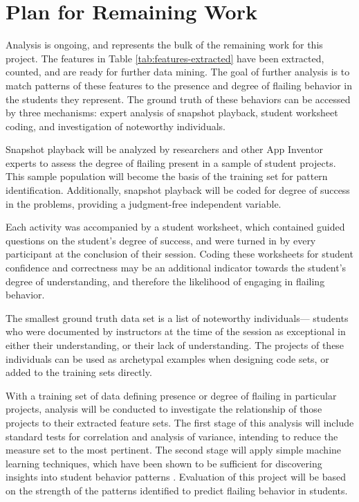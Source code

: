 \section{Plan for Remaining Work}
Analysis is ongoing, and represents the bulk of the remaining work for this project. The features in Table \ref{tab:features-extracted} have been extracted, counted, and are ready for further data mining. The goal of further analysis is to match patterns of these features to the presence and degree of flailing behavior in the students they represent. The ground truth of these behaviors can be accessed by three mechanisms: expert analysis of snapshot playback, student worksheet coding, and investigation of noteworthy individuals.  

Snapshot playback will be analyzed by researchers and other App Inventor experts to assess the degree of flailing present in a sample of student projects. This sample population will become the basis of the training set for pattern identification. Additionally, snapshot playback will be coded for degree of success in the problems, providing a judgment-free independent variable.

Each activity was accompanied by a student worksheet, which contained guided questions on the student's degree of success, and were turned in by every participant at the conclusion of their session. Coding these worksheets for student confidence and correctness may be an additional indicator towards the student's degree of understanding, and therefore the likelihood of engaging in flailing behavior.

The smallest ground truth data set is a list of noteworthy individuals--- students who were documented by instructors at the time of the session as exceptional in either their understanding, or their lack of understanding. The projects of these individuals can be used as archetypal examples when designing code sets, or added to the training sets directly.

With a training set of data defining presence or degree of flailing in particular projects, analysis will be conducted to investigate the relationship of those projects to their extracted feature sets. The first stage of this analysis will include standard tests for correlation and analysis of variance, intending to reduce the measure set to the most pertinent. The second stage will apply simple machine learning techniques, which have been shown to be sufficient for discovering insights into student behavior patterns \citep{blikstein2014}.
Evaluation of this project will be based on the strength of the patterns identified to predict flailing behavior in students. 

